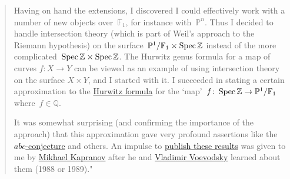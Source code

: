 \begin{quote}
  Having on hand the extensions, I discovered I could effectively work with a number of new objects over~$\mathbb{F}_1$, for instance with~$\mathbb{P}^n$. Thus I decided to handle intersection theory (which is part of Weil's approach to the Riemann hypothesis) on the surface~$\mathbb{P}^1/\mathbb{F}_1\times\operatorname{Spec}\mathbb{Z}$ instead of the more complicated~$\operatorname{Spec}\mathbb{Z}\times\operatorname{Spec}\mathbb{Z}$. The Hurwitz genus formula for a map of curves $f\colon X\rightarrow Y$ can be viewed as an example of using intersection theory on the surface $X\times Y$, and I started with it. I succeeded in stating a certain approximation to the \href{http://en.wikipedia.org/wiki/Riemann–Hurwitz_formula}{Hurwitz formula} for the `map'~$f\colon\operatorname{Spec}\mathbb{Z}\to\mathbb{P}^1/\mathbb{F}_1$ where~$f\in\mathbb{Q}$.

  It was somewhat surprising (and confirming the importance of the approach) that this approximation gave very profound assertions like the \href{http://en.wikipedia.org/wiki/Abc_conjecture}{$abc$-conjecture} and others. An impulse to \href{http://matrix.cmi.ua.ac.be/ngeometry/library/Smirnov1991.pdf}{publish these results} was given to me by \href{http://directory.math.yale.edu/public_html/People/mk486.html}{Mikhael Kapranov} after he and \href{http://en.wikipedia.org/wiki/Vladimir_Voevodsky}{Vladimir Voevodsky} learned about them (1988 or 1989)."
\end{quote} 

